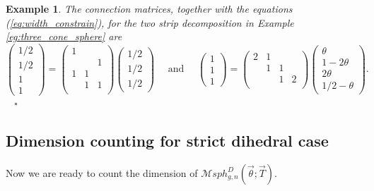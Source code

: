 \documentclass[pdflatex,sn-mathphys]{sn-jnl}%
\numberwithin{equation}{section}
\theoremstyle{thmstyleone}%
\newtheorem{example}[theorem]{Example}%
\newcommand{\MsphgnDT}{\mathcal{M}sph_{g,n}^D(\vec{\theta};\vec{T})}
\begin{document}

\begin{example}
    The connection matrices, together with the equations (\ref{eq:width_constrain}), for the two strip decomposition in Example \ref{eg:three_cone_sphere} are
    \[
    \begin{pmatrix}    1/2  \\ 1/2  \\ 1 \\ 1    \end{pmatrix}
    = \begin{pmatrix}
       1 &   &   \\
         &   & 1 \\
       1 & 1 &   \\
         & 1 & 1 \\
    \end{pmatrix}
    \begin{pmatrix}    1/2  \\ 1/2  \\ 1/2    \end{pmatrix}
    \quad \text{ and } \quad
    \begin{pmatrix}    1  \\ 1  \\ 1     \end{pmatrix}
    = \begin{pmatrix}
       2 & 1 &   &  \\
         & 1 & 1 &  \\
         &   & 1 & 2\\
    \end{pmatrix}
    \begin{pmatrix}    \theta  \\ 1-2\theta  \\ 2\theta  \\ 1/2-\theta  \end{pmatrix}.
    \]
    ~ \hfill $\square$
\end{example}

\subsection{Dimension counting for strict dihedral case}
Now we are ready to count the dimension of $\MsphgnDT$.
\end{document}
